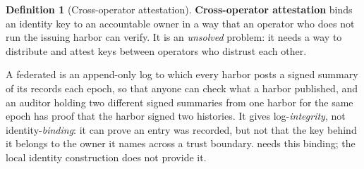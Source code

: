 \documentclass[11pt,a4paper]{article}
\theoremstyle{definition}
\newtheorem{definition}{Definition}[section]
\begin{document}
\begin{definition}[Cross-operator attestation]\label{def:cross-operator-attestation}\label{def:0040b}
\setlength{\parskip}{4pt plus 1pt}
\textbf{Cross-operator attestation} binds an identity key to an accountable
owner in a way that an operator who does not run the issuing harbor can
verify. It is an \emph{unsolved} problem: it needs a way to distribute and
attest keys between operators who distrust each other.

A federated  is an append-only log to which every harbor
posts a signed summary of its records each epoch, so that anyone can check
what a harbor published, and an auditor holding two different signed
summaries from one harbor for the same epoch has proof that the harbor signed
two histories. It gives log-\emph{integrity}, not
identity-\emph{binding}: it can prove an entry was recorded, but not that the
key behind it belongs to the owner it names across a trust boundary.
 needs this binding; the local identity
construction does not provide it.
\end{definition}
\end{document}
